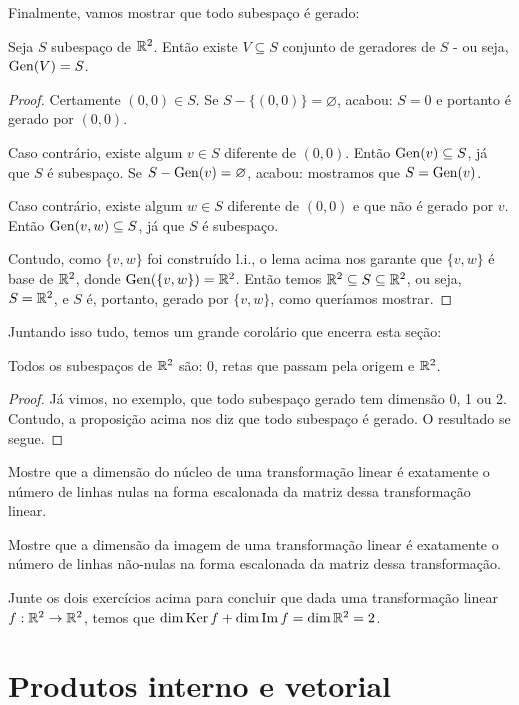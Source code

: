 Finalmente, vamos mostrar que todo subespaço é gerado:
\begin{prop}
	Seja $S$ subespaço de $\mathbb R^2$. Então existe $V\subseteq S$ conjunto de geradores de $S$ - ou seja, $\operatorname{Gen}(V)=S$.
\end{prop}
\begin{proof}
	Certamente $(0,0)\in S$. Se $S-\{(0,0)\}=\varnothing$, acabou: $S=0$ e portanto é gerado por $(0,0)$.
	
	Caso contrário, existe algum $v\in S$ diferente de $(0,0)$. Então $\operatorname{Gen}(v)\subseteq S$, já que $S$ é subespaço. Se $S-\operatorname{Gen}(v)=\varnothing$, acabou: mostramos que $S=\operatorname{Gen}(v)$.
	
	Caso contrário, existe algum $w\in S$ diferente de $(0,0)$ e que não é gerado por $v$. Então $\operatorname{Gen}({v,w})\subseteq S$, já que $S$ é subespaço.
	
	Contudo, como $\{v,w\}$ foi construído l.i., o lema acima nos garante que $\{v,w\}$ é base de $\mathbb R^2$, donde $\operatorname{Gen}(\{v,w\})=\mathbb R^2$. Então temos $\mathbb R^2\subseteq S\subseteq\mathbb R^2$, ou seja, $S=\mathbb R^2$, e $S$ é, portanto, gerado por $\{v,w\}$, como queríamos mostrar.
\end{proof}

Juntando isso tudo, temos um grande corolário que encerra esta seção:
\begin{prop}
	Todos os subespaços de $\mathbb R^2$ são: $0$, retas que passam pela origem e $\mathbb R^2$.
\end{prop}
\begin{proof}
	Já vimos, no exemplo, que todo subespaço gerado tem dimensão 0, 1 ou 2. Contudo, a proposição acima nos diz que todo subespaço é gerado. O resultado se segue.
\end{proof}
\begin{exerc}
	Mostre que a dimensão do núcleo de uma transformação linear é exatamente o número de linhas nulas na forma escalonada da matriz dessa transformação linear.
\end{exerc}
\begin{exerc}
	Mostre que a dimensão da imagem de uma transformação linear é exatamente o número de linhas não-nulas na forma escalonada da matriz dessa transformação.
\end{exerc}
\begin{exerc}
	Junte os dois exercícios acima para concluir que dada uma transformação linear $f:\mathbb R^2\to\mathbb R^2$, temos que $\dim\operatorname{Ker} f+\dim\operatorname{Im} f=\dim\mathbb R^2=2$.
\end{exerc}

\section{Produtos interno e vetorial}

